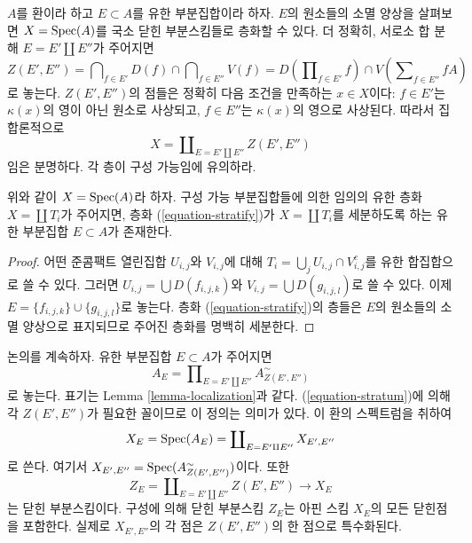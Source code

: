 \noindent
$A$를 환이라 하고 $E \subset A$를 유한 부분집합이라 하자.
$E$의 원소들의 소멸 양상을 살펴보면
$X = \mathop{\mathrm{Spec}}(A)$를 국소 닫힌 부분스킴들로 층화할 수 있다.
더 정확히, 서로소 합 분해 $E = E' \amalg E''$가 주어지면
\begin{equation}
\label{equation-stratum}
Z(E', E'') =
\bigcap\nolimits_{f \in E'} D(f) \cap \bigcap\nolimits_{f \in E''} V(f) =
D(\prod\nolimits_{f \in E'} f) \cap V( \sum\nolimits_{f \in E''} fA)
\end{equation}
로 놓는다. $Z(E', E'')$의 점들은 정확히 다음 조건을 만족하는
$x \in X$이다: $f \in E'$는 $\kappa(x)$의 영이 아닌 원소로 사상되고,
$f \in E''$는 $\kappa(x)$의 영으로 사상된다. 따라서 집합론적으로
\begin{equation}
\label{equation-stratify}
X = \coprod\nolimits_{E = E' \amalg E''} Z(E', E'')
\end{equation}
임은 분명하다. 각 층이 구성 가능임에 유의하라.

\begin{lemma}
\label{lemma-refine}
위와 같이 $X = \mathop{\mathrm{Spec}}(A)$라 하자.
구성 가능 부분집합들에 의한 임의의 유한 층화
$X = \coprod T_i$가 주어지면, 층화 (\ref{equation-stratify})가
$X = \coprod T_i$를 세분하도록 하는 유한 부분집합 $E \subset A$가 존재한다.
\end{lemma}

\begin{proof}
어떤 준콤팩트 열린집합 $U_{i, j}$와 $V_{i, j}$에 대해
$T_i = \bigcup_j U_{i, j} \cap V_{i, j}^c$를 유한 합집합으로 쓸 수 있다.
그러면 $U_{i, j} = \bigcup D(f_{i, j, k})$와
$V_{i, j} = \bigcup D(g_{i, j, l})$로 쓸 수 있다.
이제 $E = \{f_{i, j, k}\} \cup \{g_{i, j, l}\}$로 놓는다.
층화 (\ref{equation-stratify})의 층들은 $E$의 원소들의 소멸 양상으로
표지되므로 주어진 층화를 명백히 세분한다.
\end{proof}

\noindent
논의를 계속하자.
유한 부분집합 $E \subset A$가 주어지면
\begin{equation}
\label{equation-ring}
A_E = \prod\nolimits_{E = E' \amalg E''} A_{Z(E', E'')}^\sim
\end{equation}
로 놓는다. 표기는 Lemma \ref{lemma-localization}과 같다.
(\ref{equation-stratum})에 의해 각 $Z(E', E'')$가 필요한 꼴이므로
이 정의는 의미가 있다. 이 환의 스펙트럼을 취하여
\begin{equation}
\label{equation-spectrum}
X_E = \mathop{\mathrm{Spec}}(A_E) = \coprod\nolimits_{E = E' \amalg E''} X_{E', E''}
\end{equation}
로 쓴다. 여기서
$X_{E', E''} = \mathop{\mathrm{Spec}}(A_{Z(E', E'')}^\sim)$이다. 또한
\begin{equation}
\label{equation-closed}
Z_E = \coprod\nolimits_{E = E' \amalg E''} Z(E', E'')
\longrightarrow
X_E
\end{equation}
는 닫힌 부분스킴이다.
구성에 의해 닫힌 부분스킴 $Z_E$는 아핀 스킴 $X_E$의
모든 닫힌점을 포함한다. 실제로 $X_{E', E''}$의 각 점은
$Z(E', E'')$의 한 점으로 특수화된다.

